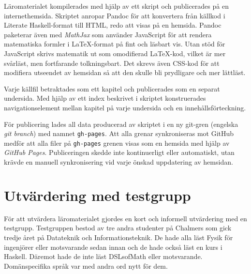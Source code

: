 Läromaterialet kompilerades med hjälp av ett skript och
publicerades på en internethemsida. Skriptet anropar
Pandoc för att konvertera från källkod i Literate
Haskell-format till HTML, redo att visas på en hemsida. Pandoc
paketerar även med \textit{MathJax} som använder JavaScript för att
rendera matematiska formler i LaTeX-format på fint och läsbart
vis. Utan stöd för JavaScript skrivs matematik ut som omodifierad
LaTeX-kod, vilket är mer svårläst, men fortfarande tolkningsbart. Det
skrevs även CSS-kod för att modifiera utseendet av
hemsidan så att den skulle bli prydligare och mer lättläst.

Varje källfil betraktades som ett kapitel och publicerades som en
separat undersida. Med hjälp av ett index beskrivet i skriptet
konstruerades navigationselement mellan kapitel på varje undersida
och en innehållsförteckning.

För publicering lades all data producerad av skriptet i en ny git-gren (engelska \textit{git branch}) med namnet \texttt{gh-pages}. Att alla grenar synkroniseras
mot GitHub medför att alla filer på \texttt{gh-pages} grenen
visas som en hemsida med hjälp av \textit{GitHub
  Pages}. Publiceringen skedde inte kontinuerligt eller automatiskt,
utan krävde en manuell synkronisering vid varje önskad uppdatering av
hemsidan.

\section{Utvärdering med testgrupp}


För att utvärdera läromaterialet gjordes en kort och informell utvärdering med
en testgrupp. Testgruppen bestod av tre andra studenter på Chalmers som gick
tredje året på Datateknik och Informationsteknik. De hade alla läst Fysik för
ingenjörer eller motsvarande sedan innan och de hade också läst en kurs i Haskell.
Däremot hade de inte läst DSLsofMath eller motsvarande. Domänspecifika språk var
med andra ord nytt för dem.

